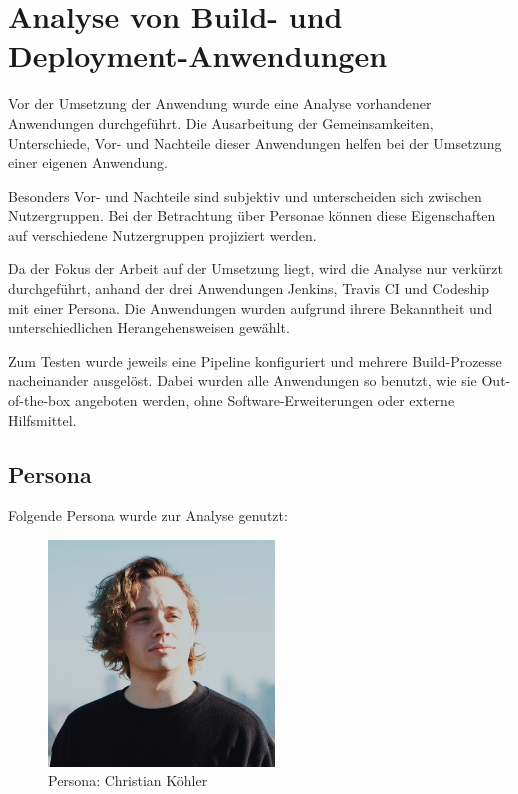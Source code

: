 \chapter{Analyse von Build- und Deployment-Anwendungen}

Vor der Umsetzung der Anwendung wurde eine Analyse vorhandener Anwendungen durchgeführt. Die Ausarbeitung der Gemeinsamkeiten, Unterschiede, Vor- und Nachteile dieser Anwendungen helfen bei der Umsetzung einer eigenen Anwendung.

Besonders Vor- und Nachteile sind subjektiv und unterscheiden sich zwischen Nutzergruppen. Bei der Betrachtung über Personae können diese Eigenschaften auf verschiedene Nutzergruppen projiziert werden.

Da der Fokus der Arbeit auf der Umsetzung liegt, wird die Analyse nur verkürzt durchgeführt, anhand der drei Anwendungen Jenkins, Travis CI und Codeship mit einer Persona. Die Anwendungen wurden aufgrund ihrere Bekanntheit und unterschiedlichen Herangehensweisen gewählt.

Zum Testen wurde jeweils eine Pipeline konfiguriert und mehrere Build-Prozesse nacheinander ausgelöst. Dabei wurden alle Anwendungen so benutzt, wie sie Out-of-the-box angeboten werden, ohne Software-Erweiterungen oder externe Hilfsmittel.

\section{Persona}

Folgende Persona wurde zur Analyse genutzt:

\begin{figure}[h]
  \caption{Persona: Christian Köhler}
  \label{fig:persona}
  \includegraphics[width=6cm]{assets/persona}
\end{figure}

